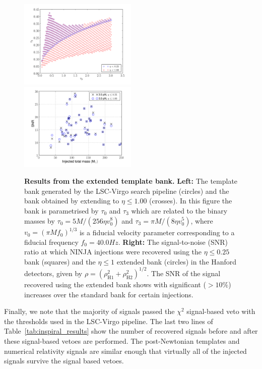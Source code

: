 \begin{figure}
  \includegraphics[width=0.50\textwidth]{figures/ninja1/BankBoth}
  \includegraphics[width=0.50\textwidth]{figures/ninja1/HanfordSNR}
  \caption{{\bf Results from the extended template bank.} 
  {\bf Left:} The template bank generated by the LSC-Virgo
  search pipeline (circles) and the bank obtained by extending to
  $\eta \leq 1.00$ (crosses). In this figure the bank is parametrised
  by $\tau_0$ and $\tau_3$ which are related to the binary masses by
  $\tau_0 = 5M/(256\eta v_0^8)$ and $\tau_3 = \pi M/(8\eta v_0^5)$,
  where $v_0 = (\pi M f_0)^{1/3}$ is a fiducial velocity parameter
  corresponding to a fiducial frequency $f_0 = 40.0 Hz$.
  {\bf Right:} The
  signal-to-noise (SNR) ratio at which NINJA injections were recovered using
  the $\eta \le 0.25$ bank (squares) and the $\eta \le 1$ extended bank
  (circles) in the Hanford detectors, given by $\rho =
  (\rho_\mathrm{H1}^2 + \rho_\mathrm{H2}^2)^{1/2}$. The SNR of the signal
  recovered using the extended bank shows with significant ($> 10\%$) 
  increases over the standard bank for certain injections.}
  \label{f:templateBanks}
\end{figure}

Finally, we note that the majority of signals passed the $\chi^2$
signal-based veto with the thresholds used in the LSC-Virgo pipeline.  The
last two lines of Table~\ref{tab:inspiral_results} show the number of
recovered signals before and after these signal-based vetoes are
performed. The post-Newtonian templates and numerical relativity signals are
similar enough that virtually all of the injected signals survive the signal
based vetoes. 

